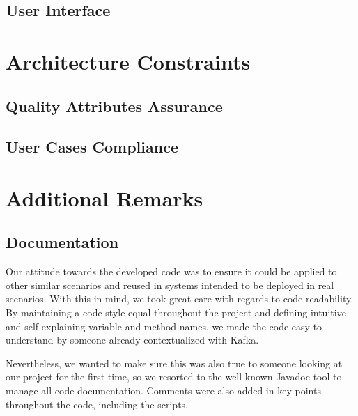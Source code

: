 \documentclass[12pt]{article}
\begin{document}
\subsection{User Interface} \label{ui} %


\newpage
\section{Architecture Constraints} \label{constraints} %


\subsection{Quality Attributes Assurance} \label{qaa} %


\subsection{User Cases Compliance} \label{compliance} %


\newpage
\section{Additional Remarks} \label{remarks} %

\subsection{Documentation} \label{documentation} %

Our attitude towards the developed code was to ensure it could be applied to other similar scenarios and reused in systems intended to be deployed in real scenarios.
With this in mind, we took great care with regards to code readability.
By maintaining a code style equal throughout the project and defining intuitive and self-explaining variable and method names, we made the code easy to understand
by someone already contextualized with Kafka.

Nevertheless, we wanted to make sure this was also true to someone looking at our project for the first time, so we resorted to the well-known Javadoc
\cite{javadoc} tool to manage all code documentation.
Comments were also added in key points throughout the code, including the scripts.
\end{document}
